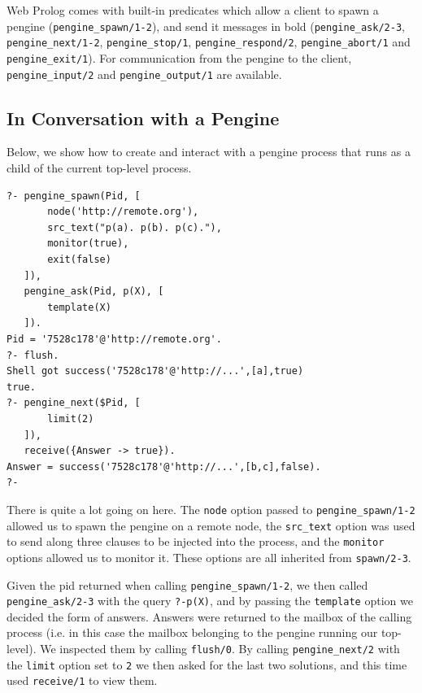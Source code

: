\documentclass{tlp}
\begin{document}
\noindent Web Prolog comes with built-in predicates which allow a client to spawn a pengine (\texttt{pengine\_spawn/1-2}), and send it messages in bold (\texttt{pengine\_ask/2-3}, \texttt{pengine\_next/1-2}, \texttt{pengine\_stop/1}, \texttt{pengine\_respond/2}, \texttt{pengine\_abort/1} and \texttt{pengine\_exit/1}). For communication from the pengine to the client, \texttt{pengine\_input/2} and \texttt{pengine\_output/1} are available.


\subsection{In Conversation with a Pengine}

Below, we show how to create and interact with a pengine process that runs as a child of the current top-level process. %

\begin{lstlisting}
?- pengine_spawn(Pid, [
       node('http://remote.org'),
       src_text("p(a). p(b). p(c)."),
       monitor(true),
       exit(false)
   ]),
   pengine_ask(Pid, p(X), [
       template(X)
   ]).
Pid = '7528c178'@'http://remote.org'.
?- flush.
Shell got success('7528c178'@'http://...',[a],true)
true.
?- pengine_next($Pid, [
       limit(2)
   ]),
   receive({Answer -> true}).
Answer = success('7528c178'@'http://...',[b,c],false).
?-
\end{lstlisting}

\noindent There is quite a lot going on here. The \texttt{node} option passed to \texttt{pengine\_spawn/1-2} allowed us to spawn the pengine on a remote node, the \texttt{src\_text} option was used to send along three clauses to be injected into the process, and the \texttt{monitor} options allowed us to monitor it. These options are all inherited from \texttt{spawn/2-3}.

Given the pid returned when calling \texttt{pengine\_spawn/1-2}, we then called \texttt{pengine\_ask/2-3} with the query \texttt{?-p(X)}, and by passing the \texttt{template} option we decided the form of answers. Answers were returned to the mailbox of the calling process (i.e. in this case the mailbox belonging to the pengine running our top-level). We inspected them by calling \texttt{flush/0}. By calling \texttt{pengine\_next/2} with the \texttt{limit} option set to \texttt{2} we then asked for the last two solutions, and this time used \texttt{receive/1} to view them.
\end{document}
